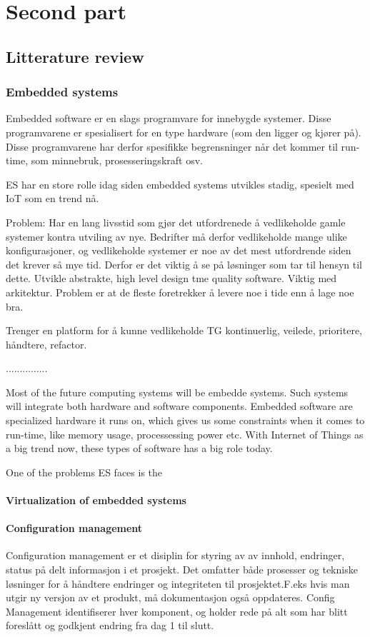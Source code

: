 \part{Second part}
\chapter{Litterature review}

\section{Embedded systems}
Embedded software er en slags programvare for innebygde systemer. Disse programvarene er spesialisert for en type hardware (som den ligger og kjører på). Disse programvarene har derfor spesifikke begrensninger når det kommer til run-time, som minnebruk, prosesseringskraft osv.

ES har en store rolle idag siden embedded systems utvikles stadig, spesielt med IoT som en trend nå.

Problem: Har en lang livsstid som gjør det utfordrenede å vedlikeholde gamle systemer kontra utviling av nye. Bedrifter må derfor vedlikeholde mange ulike konfigurasjoner, og vedlikeholde systemer er noe av det mest utfordrende siden det krever så mye tid. Derfor er det viktig å se på løsninger som tar til hensyn til dette. Utvikle abstrakte, high level design tme quality software. Viktig med arkitektur. Problem er at de fleste foretrekker å levere noe i tide enn å lage noe bra.

Trenger en platform for å kunne vedlikeholde TG kontinuerlig, veilede, prioritere, håndtere, refactor.


...............

Most of the future computing systems will be embedde systems. Such systems will integrate both hardware and software components\cite{wolfmadsen-2000}. Embedded software are specialized hardware it runs on, which gives us some constraints when it comes to run-time, like memory usage, processessing power etc. With Internet of Things as a big trend now, these types of software has a big role today. 

One of the problems ES faces is the 

\subsection{Virtualization of embedded systems}


\subsection{Configuration management}
Configuration management er et disiplin for styring av av innhold, endringer, status på delt informasjon i et prosjekt. Det omfatter både prosesser og tekniske løsninger for å håndtere endringer og integriteten til prosjektet.F.eks hvis man utgir ny versjon av et produkt, må dokumentasjon også oppdateres. Config Management identifiserer hver komponent, og holder rede på alt som har blitt foreslått og godkjent endring fra dag 1 til slutt.

